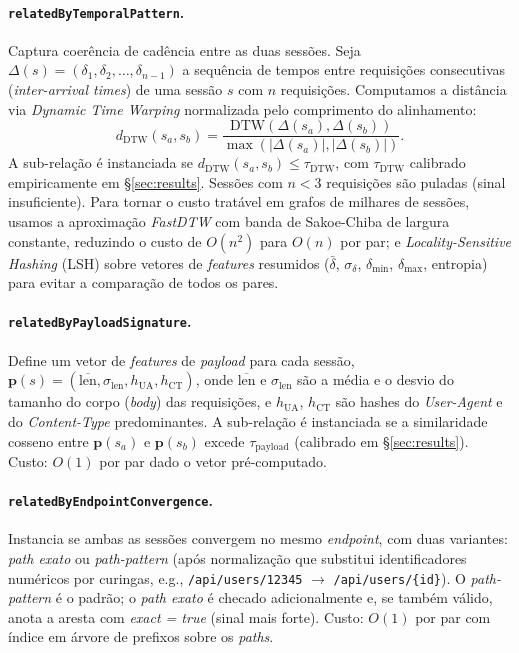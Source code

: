 \documentclass[preprint,12pt]{elsarticle}
\begin{document}
\paragraph{\texttt{relatedByTemporalPattern}.} Captura coerência de cadência entre as duas sessões. Seja $\Delta(s) = (\delta_1, \delta_2, \ldots, \delta_{n-1})$ a sequência de tempos entre requisições consecutivas (\emph{inter-arrival times}) de uma sessão $s$ com $n$ requisições. Computamos a distância via \emph{Dynamic Time Warping} normalizada pelo comprimento do alinhamento:
\begin{equation*}
    d_{\text{DTW}}(s_a, s_b) = \frac{\text{DTW}(\Delta(s_a), \Delta(s_b))}{\max(|\Delta(s_a)|, |\Delta(s_b)|)}.
\end{equation*}
A sub-relação é instanciada se $d_{\text{DTW}}(s_a, s_b) \leq \tau_{\text{DTW}}$, com $\tau_{\text{DTW}}$ calibrado empiricamente em §\ref{sec:results}. Sessões com $n < 3$ requisições são puladas (sinal insuficiente). Para tornar o custo tratável em grafos de milhares de sessões, usamos a aproximação \emph{FastDTW} com banda de Sakoe-Chiba de largura constante, reduzindo o custo de $O(n^2)$ para $O(n)$ por par; e \emph{Locality-Sensitive Hashing} (LSH) sobre vetores de \emph{features} resumidos ($\bar\delta$, $\sigma_\delta$, $\delta_{\min}$, $\delta_{\max}$, entropia) para evitar a comparação de todos os pares.

\paragraph{\texttt{relatedByPayloadSignature}.} Define um vetor de \emph{features} de \emph{payload} para cada sessão, $\mathbf{p}(s) = (\overline{\text{len}}, \sigma_{\text{len}}, h_{\text{UA}}, h_{\text{CT}})$, onde $\overline{\text{len}}$ e $\sigma_{\text{len}}$ são a média e o desvio do tamanho do corpo (\emph{body}) das requisições, e $h_{\text{UA}}$, $h_{\text{CT}}$ são hashes do \emph{User-Agent} e do \emph{Content-Type} predominantes. A sub-relação é instanciada se a similaridade cosseno entre $\mathbf{p}(s_a)$ e $\mathbf{p}(s_b)$ excede $\tau_{\text{payload}}$ (calibrado em §\ref{sec:results}). Custo: $O(1)$ por par dado o vetor pré-computado.

\paragraph{\texttt{relatedByEndpointConvergence}.} Instancia se ambas as sessões convergem no mesmo \emph{endpoint}, com duas variantes: \emph{path exato} ou \emph{path-pattern} (após normalização que substitui identificadores numéricos por curingas, e.g., \texttt{/api/users/12345} $\to$ \texttt{/api/users/\{id\}}). O \emph{path-pattern} é o padrão; o \emph{path exato} é checado adicionalmente e, se também válido, anota a aresta com \emph{exact = true} (sinal mais forte). Custo: $O(1)$ por par com índice em árvore de prefixos sobre os \emph{paths}.
\end{document}
